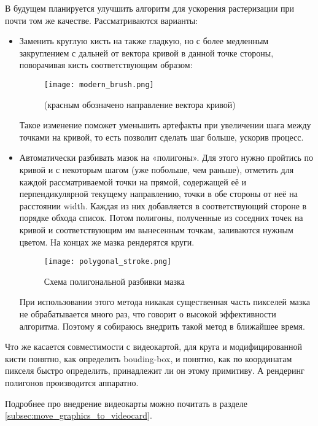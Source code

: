 В будущем планируется улучшить алгоритм для ускорения растеризации при почти том же качестве.
Рассматриваются варианты:
\begin{itemize}
    \item Заменить круглую кисть на также гладкую, но с более медленным закруглением с дальней от вектора кривой в данной точке стороны, поворачивая кисть соответствующим образом:
    \begin{figure}[h!]
        \centering
        \texttt{[image: modern\_brush.png]}
        \caption{(красным обозначено направление вектора кривой)}
        \label{fig:modern_brush}
    \end{figure}
    Такое изменение поможет уменьшить артефакты при увеличении шага между точками на кривой, то есть позволит сделать шаг больше, ускорив процесс.

    \item Автоматически разбивать мазок на «полигоны».
                Для этого нужно пройтись по кривой и с некоторым шагом (уже побольше, чем раньше),
                отметить для каждой рассматриваемой точки на прямой, содержащей её и перпендикулярной текущему направлению, точки в обе стороны от неё на расстоянии width.
                Каждая из них добавляется в соответствующий стороне в порядке обхода список.
                Потом полигоны, полученные из соседних точек на кривой и соответствующим им вынесенным точкам, заливаются нужным цветом.
                На концах же мазка рендерятся круги.

    \begin{figure}[h!]
        \centering
        \texttt{[image: polygonal\_stroke.png]}
        \caption{Схема полигональной разбивки мазка}
        \label{fig:polygonal_stroke}
    \end{figure}

    При использовании этого метода никакая существенная часть пикселей мазка не обрабатывается много раз, что говорит о высокой эффективности алгоритма.
    Поэтому я собираюсь внедрить такой метод в ближайшее время.
\end{itemize}

Что же касается совместимости с видеокартой,
для круга и модифицированной кисти понятно, как определить bouding-box,
и понятно, как по координатам пикселя быстро определить, принадлежит ли он этому примитиву.
А рендеринг полигонов производится аппаратно.

Подробнее про внедрение видеокарты можно почитать в разделе \ref{subsec:move_graphics_to_videocard}.


